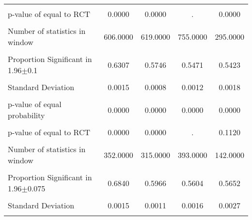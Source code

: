 {\begin{tabular}{l*{4}{c}}
                &                  &                  &                  &                  \\
p-value of equal to RCT&   0.0000         &   0.0000         &        .         &   0.0000         \\
                &                  &                  &                  &                  \\
Number of statistics in window& 606.0000         & 619.0000         & 755.0000         & 295.0000         \\
                &                  &                  &                  &                  \\
\hline Proportion Significant in 1.96$\pm$0.1&   0.6307         &   0.5746         &   0.5471         &   0.5423         \\
                &                  &                  &                  &                  \\
Standard Deviation&   0.0015         &   0.0008         &   0.0012         &   0.0018         \\
                &                  &                  &                  &                  \\
p-value of equal probability&   0.0000         &   0.0000         &   0.0000         &   0.0000         \\
                &                  &                  &                  &                  \\
p-value of equal to RCT&   0.0000         &   0.0000         &        .         &   0.1120         \\
                &                  &                  &                  &                  \\
Number of statistics in window& 352.0000         & 315.0000         & 393.0000         & 142.0000         \\
                &                  &                  &                  &                  \\
\hline Proportion Significant in 1.96$\pm$0.075&   0.6840         &   0.5966         &   0.5604         &   0.5652         \\
                &                  &                  &                  &                  \\
Standard Deviation&   0.0015         &   0.0011         &   0.0016         &   0.0027         \\
                &                  &                  &                  &                  \\

\end{tabular}}
